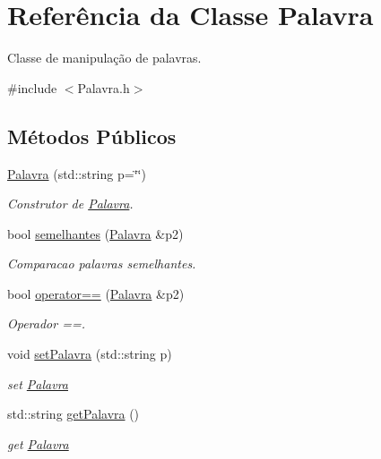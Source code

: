 \hypertarget{classPalavra}{}\section{Referência da Classe Palavra}
\label{classPalavra}


Classe de manipulação de palavras.  




{\ttfamily \#include $<$Palavra.\+h$>$}

\subsection*{Métodos Públicos}
\begin{DoxyCompactItemize}
\item 
\hyperlink{classPalavra_a81db9f79dee404bfd73fe9fc9f861be3}{Palavra} (std\+::string p=\char`\"{}\char`\"{})
\begin{DoxyCompactList}\small\item\em Construtor de \hyperlink{classPalavra}{Palavra}. \end{DoxyCompactList}\item 
bool \hyperlink{classPalavra_ae3c7cea7ef6603efb3899adc34dba9d8}{semelhantes} (\hyperlink{classPalavra}{Palavra} \&p2)
\begin{DoxyCompactList}\small\item\em Comparacao palavras semelhantes. \end{DoxyCompactList}\item 
bool \hyperlink{classPalavra_a0db696a5fd0261a07d35d367a114afa7}{operator==} (\hyperlink{classPalavra}{Palavra} \&p2)
\begin{DoxyCompactList}\small\item\em Operador ==. \end{DoxyCompactList}\item 
void \hyperlink{classPalavra_a77fbc808d5749f73a2974b7276a0d000}{set\+Palavra} (std\+::string p)
\begin{DoxyCompactList}\small\item\em set \hyperlink{classPalavra}{Palavra} \end{DoxyCompactList}\item 
std\+::string \hyperlink{classPalavra_a08bfe271e5e30c04f711fcf94609ab9a}{get\+Palavra} ()
\begin{DoxyCompactList}\small\item\em get \hyperlink{classPalavra}{Palavra} \end{DoxyCompactList}\end{DoxyCompactItemize}


